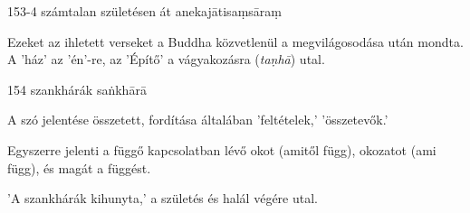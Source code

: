 
\begin{notesdescription}

\item[{153-4}
{számtalan születésen át}
{anekajātisaṃsāraṃ}] \hfill\par

Ezeket az ihletett verseket a Buddha közvetlenül a megvilágosodása után mondta. A 'ház' az 'én'-re, az 'Építő' a vágyakozásra (\textit{taṇhā}) utal.

\item[{154}
{szankhárák}
{saṅkhārā}] \hfill\par

A szó jelentése összetett, fordítása általában 'feltételek,' 'összetevők.'

Egyszerre jelenti a függő kapcsolatban lévő okot (amitől függ), okozatot (ami függ), és magát a függést.

'A szankhárák kihunyta,' a születés és halál végére utal.

\end{notesdescription}

